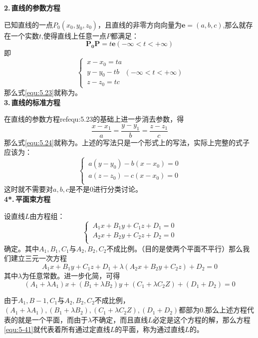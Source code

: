 \noindent \textbf{2.$\,$直线的参数方程}
\par 已知直线的一点$P_0(x_0,y_0,z_0)$，且直线的非零方向向量为$\boldsymbol{e}=(a,b,c)$,那么就存在一个实数$t$,使得直线上任意一点$P$都满足：
\begin{equation}
	\boldsymbol{P_0P}=t\boldsymbol{e}(-\infty<t<+\infty)
\end{equation}
即
\begin{equation}
	\begin{cases}
		\, x-x_0=ta\\
		\, y-y_0-tb\\
		\, z-z_0=tc
	\end{cases}
(-\infty<t<+\infty)
\label{equ:5.23}
\end{equation}
那么式\eqref{equ:5.23}就称为。\\[1em]
\textbf{3.$\,$直线的标准方程}
\par 在直线的参数方程ref{equ:5.23}的基础上进一步消去参数，得
\begin{equation}
	\frac{x-x_1}{a}=\frac{y-y_1}{b}=\frac{z-z_1}{c}
\label{equ:5.24}
\end{equation}
那么式\eqref{equ:5.24}就称为。上述的写法只是一个形式上的写法，实际上完整的式子应该为：
\begin{equation}
	\begin{cases}
		\, a(y-y_0)-b(x-x_0)=0\\
		\, a(z-z_0)-c(x-x_0)=0\\
	\end{cases}
\end{equation}
这时就不需要对$a,b,c$是不是0进行分类讨论。\\[1em]
\textbf{4*.$\,$平面束方程}
\par 设直线$L$由方程组：
\begin{equation}
	\begin{cases}
\, A_1x+B_1y+C_1z+D_1=0\\
\, A_2x+B_2y+C_2z+D_2=0\\
\end{cases}
\end{equation}
确定。其中$A_1,B_1,C_1$与$A_2,B_2,C_2$不成比例。（目的是使两个平面不平行）那么我们建立三元一次方程
\begin{equation}
	A_1x+B_1y+C_1z+D_1+\lambda(A_2x+B_2y+C_2z)+D_2=0
\label{equ:5-41}	
\end{equation}
其中$\lambda$为任意常数。进一步化简，可得
\begin{equation}
	(A_1+\lambda A_1)x+(B_1+\lambda B_2)y+(C_1+\lambda C_2Z)+(D_1+D_2)=0
\end{equation}
\par 由于$A_1,B-1,C_1$与$A_2,B_2,C_2$不成比例，$(A_1+\lambda A_1),(B_1+\lambda B_2),(C_1+\lambda C_2Z),(D_1+D_2)$都部为0.那么上述方程代表的就是一个平面，而由于$\lambda$不确定，而且直线$L$必定是这个方程的解，那么方程\eqref{equ:5-41}就代表着所有通过定直线$L$的平面，称为通过直线$L$的。

